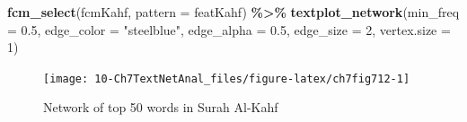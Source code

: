 \documentclass[
]{article}
\newenvironment{Shaded}{\begin{snugshade}}{\end{snugshade}}
\newcommand{\AttributeTok}[1]{\textcolor[rgb]{0.13,0.29,0.53}{#1}}
\newcommand{\DecValTok}[1]{\textcolor[rgb]{0.00,0.00,0.81}{#1}}
\newcommand{\FloatTok}[1]{\textcolor[rgb]{0.00,0.00,0.81}{#1}}
\newcommand{\FunctionTok}[1]{\textcolor[rgb]{0.13,0.29,0.53}{\textbf{#1}}}
\newcommand{\NormalTok}[1]{#1}
\newcommand{\SpecialCharTok}[1]{\textcolor[rgb]{0.81,0.36,0.00}{\textbf{#1}}}
\newcommand{\StringTok}[1]{\textcolor[rgb]{0.31,0.60,0.02}{#1}}
\begin{document}
\begin{Shaded}
\begin{Highlighting}[]
\FunctionTok{fcm\_select}\NormalTok{(fcmKahf, }\AttributeTok{pattern =}\NormalTok{ featKahf) }\SpecialCharTok{\%\textgreater{}\%}
    \FunctionTok{textplot\_network}\NormalTok{(}\AttributeTok{min\_freq =} \FloatTok{0.5}\NormalTok{, }
                     \AttributeTok{edge\_color =} \StringTok{"steelblue"}\NormalTok{, }
                     \AttributeTok{edge\_alpha =} \FloatTok{0.5}\NormalTok{, }
                     \AttributeTok{edge\_size =} \DecValTok{2}\NormalTok{,}
                     \AttributeTok{vertex.size =} \DecValTok{1}\NormalTok{)}
\end{Highlighting}
\end{Shaded}

\begin{figure}

{\centering \texttt{[image: 10-Ch7TextNetAnal\_files/figure-latex/ch7fig712-1]} 

}

\caption{Network of top 50 words in Surah Al-Kahf}\label{fig:ch7fig712}
\end{figure}
\end{document}
